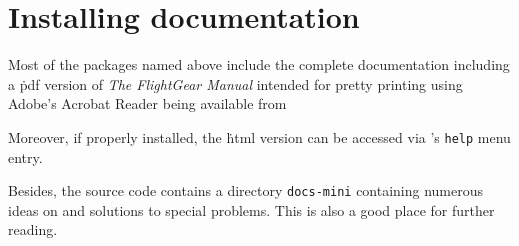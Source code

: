 \section{Installing documentation}

Most of the packages named above include the complete \FlightGear{}
documentation including a \.pdf version of \textit{The FlightGear
Manual} intended for pretty printing using Adobe's Acrobat Reader being
available from
 \medskip

 \medskip

 \noindent
 Moreover, if properly installed, the \.html version can be accessed via
\FlightGear{}'s \texttt{help} menu entry.

Besides, the source code contains a directory \texttt{docs-mini} containing numerous
ideas on and solutions to special problems. This is also a good place for further
reading.

